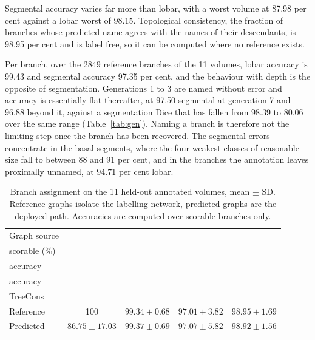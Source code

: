 \documentclass[runningheads]{llncs}
\newcommand{\hd}[1]{\makecell[c]{#1}}
\begin{document}
Segmental accuracy varies far more than lobar, with a worst volume at 87.98 per
cent against a lobar worst of 98.15. Topological consistency, the fraction of
branches whose predicted name agrees with the names of their descendants, is
98.95 per cent and is label free, so it can be computed where no reference
exists.

Per branch, over the 2849 reference branches of the 11 volumes, lobar accuracy
is 99.43 and segmental accuracy 97.35 per cent, and the behaviour with depth is
the opposite of segmentation. Generations 1 to 3 are named without error and
accuracy is essentially flat thereafter, at 97.50 segmental at generation 7 and
96.88 beyond it, against a segmentation Dice that has fallen from 98.39 to 80.06
over the same range (Table~\ref{tab:gen}). Naming a branch is therefore not the
limiting step once the branch has been recovered. The segmental errors
concentrate in the basal segments, where the four weakest classes of reasonable
size fall to between 88 and 91 per cent, and in the branches the annotation
leaves proximally unnamed, at 94.71 per cent lobar.

\begin{table}[tbp]
\centering
\caption{Branch assignment on the 11 held-out annotated volumes, mean $\pm$ SD.
Reference graphs isolate the labelling network, predicted graphs are the
deployed path. Accuracies are computed over scorable branches only.}
\label{tab:label}
\setlength{\tabcolsep}{5pt}\footnotesize
\begin{tabular}{@{}lcccc@{}}
\toprule
Graph source & \hd{Branches\\scorable (\%)} & \hd{Lobar\\accuracy} &
\hd{Segmental\\accuracy} & \hd{Segmental\\TreeCons} \\
\midrule
Reference  & 100 & $99.34\pm0.68$ & $97.01\pm3.82$ & $98.95\pm1.69$ \\
Predicted  & $86.75\pm17.03$ & $99.37\pm0.69$ & $97.07\pm5.82$ & $98.92\pm1.56$ \\
\bottomrule
\end{tabular}
\end{table}
\end{document}
